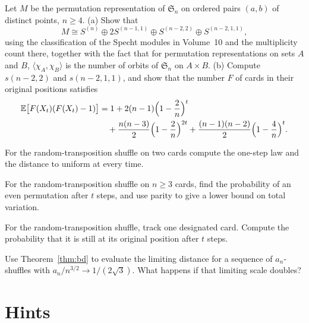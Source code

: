 \begin{exercise}[$\star\star\star$]\label{ex:orderedpairs}
Let $M$ be the permutation representation of $\mathfrak S_n$ on ordered pairs $(a,b)$ of distinct points, $n\ge4$. (a) Show that
\[
M\cong S^{(n)}\oplus2S^{(n-1,1)}\oplus S^{(n-2,2)}\oplus S^{(n-2,1,1)},
\]
using the classification of the Specht modules in Volume~10 and the multiplicity count there, together with the fact that for permutation representations on sets $A$ and $B$, $\langle\chi_A,\chi_B\rangle$ is the number of orbits of $\mathfrak S_n$ on $A\times B$. (b) Compute $s(n-2,2)$ and $s(n-2,1,1)$, and
show that the number $F$ of cards in their original positions satisfies
\[
\begin{aligned}\mathbb E\bigl[F(X_t)(F(X_t)-1)\bigr]&=1+2(n-1)\Bigl(1-\frac2n\Bigr)^t\\&\quad+\frac{n(n-3)}2\Bigl(1-\frac2n\Bigr)^{2t}+\frac{(n-1)(n-2)}2\Bigl(1-\frac4n\Bigr)^t.\end{aligned}
\]
\end{exercise}

\begin{exercise}[$\star$]\label{ex:v11-ch13-two-card}
For the random-transposition shuffle on two cards compute the one-step law and the distance to uniform at every time.
\end{exercise}

\begin{exercise}[$\star\star$]\label{ex:v11-ch13-parity}
For the random-transposition shuffle on $n\ge3$ cards, find the probability of an even permutation after $t$ steps, and use parity to give a lower bound on total variation.
\end{exercise}

\begin{exercise}[$\star\star$]\label{ex:v11-ch13-fixed-card}
For the random-transposition shuffle, track one designated card. Compute the probability that it is still at its original position after $t$ steps.
\end{exercise}

\begin{exercise}[$\star\star$]\label{ex:v11-ch13-riffle-profile}
Use Theorem~\ref{thm:bd} to evaluate the limiting distance for a sequence of $a_n$-shuffles with $a_n/n^{3/2}\to1/(2\sqrt3)$. What happens if that limiting scale doubles?
\end{exercise}

\section{Hints}

